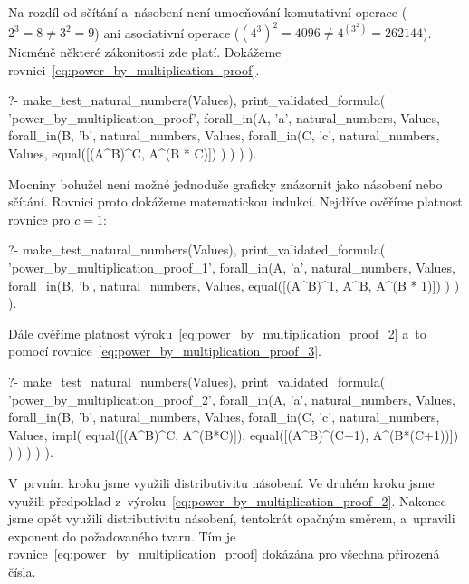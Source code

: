 Na rozdíl od sčítání a~násobení není umocňování komutativní operace (\(2^3 = 8 \neq 3^2 = 9\)) ani asociativní operace (\((4^3)^2 = 4096 \neq 4^{(3^2)} = 262144\)). Nicméně některé zákonitosti zde platí. Dokážeme rovnici~\eqref{eq:power_by_multiplication_proof}.

\begin{fact}
\begin{prolog}
?-	make_test_natural_numbers(Values),
	print_validated_formula(
		'power_by_multiplication_proof',
		forall_in(A, 'a', natural_numbers, Values,
			forall_in(B, 'b', natural_numbers, Values,
				forall_in(C, 'c', natural_numbers, Values,
					equal([(A^B)^C, A^(B * C)])
				)
			)
		)
	).
\end{prolog}
\end{fact}

Mocniny bohužel není možné jednoduše graficky znázornit jako násobení nebo sčítání. Rovnici proto dokážeme matematickou indukcí. Nejdříve ověříme platnost rovnice pro \(c = 1\):

\begin{prolog}
?-	make_test_natural_numbers(Values),
	print_validated_formula(
		'power_by_multiplication_proof_1',
		forall_in(A, 'a', natural_numbers, Values,
			forall_in(B, 'b', natural_numbers, Values,
				equal([(A^B)^1, A^B, A^(B * 1)])
			)
		)
	).
\end{prolog}

Dále ověříme platnost výroku~\eqref{eq:power_by_multiplication_proof_2} a~to pomocí rovnice~\eqref{eq:power_by_multiplication_proof_3}.

\begin{prolog}
?-	make_test_natural_numbers(Values),
	print_validated_formula(
		'power_by_multiplication_proof_2',
		forall_in(A, 'a', natural_numbers, Values,
			forall_in(B, 'b', natural_numbers, Values,
				forall_in(C, 'c', natural_numbers, Values,
					impl(
						equal([(A^B)^C, 	A^(B*C)]),
						equal([(A^B)^(C+1), 	A^(B*(C+1))])
					)
				)
			)
		)
	).
\end{prolog}

V~prvním kroku jsme využili distributivitu násobení. Ve druhém kroku jsme využili předpoklad z~výroku~\eqref{eq:power_by_multiplication_proof_2}. Nakonec jsme opět využili distributivitu násobení, tentokrát opačným směrem, a~upravili exponent do požadovaného tvaru. Tím je rovnice~\eqref{eq:power_by_multiplication_proof} dokázána pro všechna přirozená čísla.

